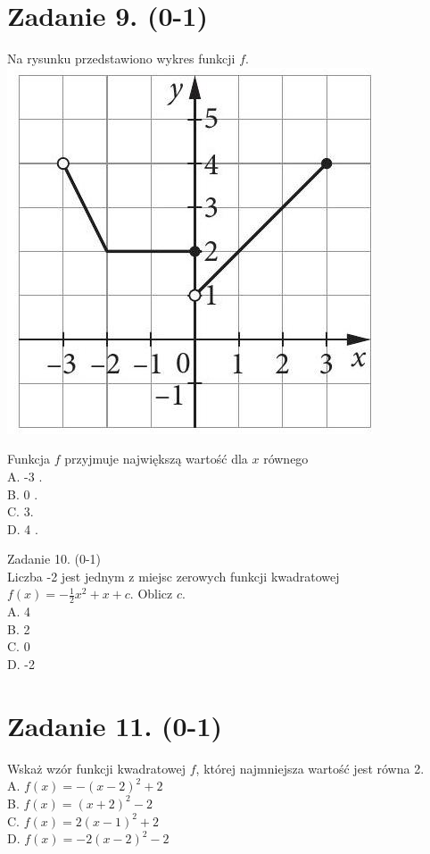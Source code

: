 \documentclass[10pt]{article}
\begin{document}
\section*{Zadanie 9. (0-1)}
Na rysunku przedstawiono wykres funkcji \(f\).\\
\includegraphics[max width=\textwidth, center]{2024_11_21_1e89351873aa60c4c1b9g-04}

Funkcja \(f\) przyjmuje największą wartość dla \(x\) równego\\
A. -3 .\\
B. 0 .\\
C. 3.\\
D. 4 .

Zadanie 10. (0-1)\\
Liczba -2 jest jednym z miejsc zerowych funkcji kwadratowej \(f(x)=-\frac{1}{2} x^{2}+x+c\). Oblicz \(c\).\\
A. 4\\
B. 2\\
C. 0\\
D. -2

\section*{Zadanie 11. (0-1)}
Wskaż wzór funkcji kwadratowej \(f\), której najmniejsza wartość jest równa 2.\\
A. \(f(x)=-(x-2)^{2}+2\)\\
B. \(f(x)=(x+2)^{2}-2\)\\
C. \(f(x)=2(x-1)^{2}+2\)\\
D. \(f(x)=-2(x-2)^{2}-2\)
\end{document}
